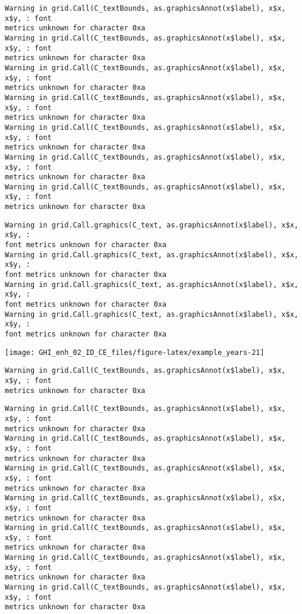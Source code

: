 \documentclass[
  10pt,
  a4paper,oneside]{article}
\begin{document}
\begin{verbatim}
Warning in grid.Call(C_textBounds, as.graphicsAnnot(x$label), x$x, x$y, : font
metrics unknown for character 0xa
Warning in grid.Call(C_textBounds, as.graphicsAnnot(x$label), x$x, x$y, : font
metrics unknown for character 0xa
Warning in grid.Call(C_textBounds, as.graphicsAnnot(x$label), x$x, x$y, : font
metrics unknown for character 0xa
Warning in grid.Call(C_textBounds, as.graphicsAnnot(x$label), x$x, x$y, : font
metrics unknown for character 0xa
Warning in grid.Call(C_textBounds, as.graphicsAnnot(x$label), x$x, x$y, : font
metrics unknown for character 0xa
Warning in grid.Call(C_textBounds, as.graphicsAnnot(x$label), x$x, x$y, : font
metrics unknown for character 0xa
Warning in grid.Call(C_textBounds, as.graphicsAnnot(x$label), x$x, x$y, : font
metrics unknown for character 0xa
\end{verbatim}

\begin{verbatim}
Warning in grid.Call.graphics(C_text, as.graphicsAnnot(x$label), x$x, x$y, :
font metrics unknown for character 0xa
Warning in grid.Call.graphics(C_text, as.graphicsAnnot(x$label), x$x, x$y, :
font metrics unknown for character 0xa
Warning in grid.Call.graphics(C_text, as.graphicsAnnot(x$label), x$x, x$y, :
font metrics unknown for character 0xa
Warning in grid.Call.graphics(C_text, as.graphicsAnnot(x$label), x$x, x$y, :
font metrics unknown for character 0xa
\end{verbatim}

\begin{center}\texttt{[image: GHI\_enh\_02\_ID\_CE\_files/figure-latex/example\_years-21]} \end{center}

\begin{verbatim}
Warning in grid.Call(C_textBounds, as.graphicsAnnot(x$label), x$x, x$y, : font
metrics unknown for character 0xa
\end{verbatim}

\begin{verbatim}
Warning in grid.Call(C_textBounds, as.graphicsAnnot(x$label), x$x, x$y, : font
metrics unknown for character 0xa
Warning in grid.Call(C_textBounds, as.graphicsAnnot(x$label), x$x, x$y, : font
metrics unknown for character 0xa
Warning in grid.Call(C_textBounds, as.graphicsAnnot(x$label), x$x, x$y, : font
metrics unknown for character 0xa
Warning in grid.Call(C_textBounds, as.graphicsAnnot(x$label), x$x, x$y, : font
metrics unknown for character 0xa
Warning in grid.Call(C_textBounds, as.graphicsAnnot(x$label), x$x, x$y, : font
metrics unknown for character 0xa
Warning in grid.Call(C_textBounds, as.graphicsAnnot(x$label), x$x, x$y, : font
metrics unknown for character 0xa
Warning in grid.Call(C_textBounds, as.graphicsAnnot(x$label), x$x, x$y, : font
metrics unknown for character 0xa
\end{verbatim}
\end{document}
